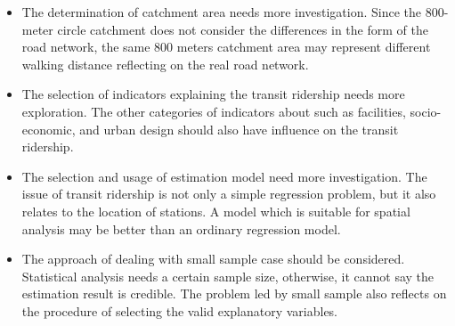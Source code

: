 %
\begin{itemize}
	\item The determination of catchment area needs more investigation. Since the 800-meter circle catchment does not consider the differences in the form of the road network, the same 800 meters catchment area may represent different walking distance reflecting on the real road network.
	
	\item The selection of indicators explaining the transit ridership needs more exploration. The other categories of indicators about such as facilities, socio-economic, and urban design should also have influence on the transit ridership.
	
	\item The selection and usage of estimation model need more investigation. The issue of transit ridership is not only a simple regression problem, but it also relates to the location of stations. A model which is suitable for spatial analysis may be better than an ordinary regression model. 
	
	\item The approach of dealing with small sample case should be considered. Statistical analysis needs a certain sample size, otherwise, it cannot say the estimation result is credible. The problem led by small sample also reflects on the procedure of selecting the valid explanatory variables. 
\end{itemize}


\clearpage %

% 
